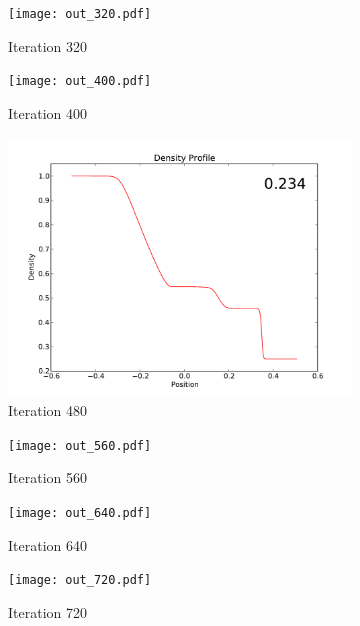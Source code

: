 \documentclass[11pt,letterpaper]{article}
\begin{document}
\begin{figure}[bth]
\centering
\begin{subfigure}{.5\textwidth}
  \centering
  \texttt{[image: out\_320.pdf]}
  \caption*{Iteration 320}
  \label{fig:sub5}
\end{subfigure}%
\begin{subfigure}{.5\textwidth}
  \centering
  \texttt{[image: out\_400.pdf]}
  \caption*{Iteration 400}
  \label{fig:sub6}
\end{subfigure}
\caption{}
\label{fig:it320and400}
\end{figure}

\begin{figure}[bth]
\centering
\begin{subfigure}{.5\textwidth}
  \centering
  \includegraphics[width=.95\linewidth]{out_480.pdf}
  \caption*{Iteration 480}
  \label{fig:sub5}
\end{subfigure}%
\begin{subfigure}{.5\textwidth}
  \centering
  \texttt{[image: out\_560.pdf]}
  \caption*{Iteration 560}
  \label{fig:sub6}
\end{subfigure}
\caption{}
\label{fig:it480and560}
\end{figure}

\begin{figure}[bth]
\centering
\begin{subfigure}{.5\textwidth}
  \centering
  \texttt{[image: out\_640.pdf]}
  \caption*{Iteration 640}
  \label{fig:sub5}
\end{subfigure}%
\begin{subfigure}{.5\textwidth}
  \centering
  \texttt{[image: out\_720.pdf]}
  \caption*{Iteration 720}
  \label{fig:sub6}
\end{subfigure}
\caption{}
\label{fig:it640and720}
\end{figure}
\end{document}
